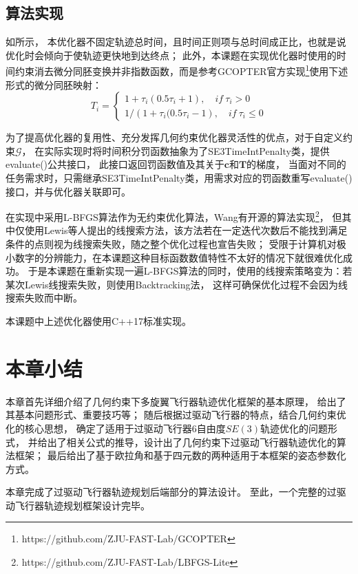 \subsection{算法实现}\label{subsec:impl_of_traj_opt_algo}
如所示， 
本优化器不固定轨迹总时间，且时间正则项与总时间成正比，也就是说优化时会倾向于使轨迹更快地到达终点；
此外，本课题在实现优化器时使用的时间约束消去微分同胚变换并非指数函数，而是参考GCOPTER官方实现\footnote{https://github.com/ZJU-FAST-Lab/GCOPTER}使用下述形式的微分同胚映射：
\begin{equation}
  T_i = 
  \begin{cases}
    1 + \tau_i(0.5\tau_i + 1), \quad if \ \tau_i > 0 \\
    {1}/({1 + \tau_i(0.5\tau_i - 1}), \quad if \ \tau_i \leq 0
  \end{cases}
  \label{equ:the_actual_diffeomorphism_used}
\end{equation}


为了提高优化器的复用性、充分发挥几何约束优化器灵活性的优点，对于自定义约束$\mathcal{G}$，
在实际实现时将时间积分罚函数抽象为了SE3TimeIntPenalty类，提供evaluate()公共接口，
此接口返回罚函数值及其关于$\bm{c}$和$\bm{T}$的梯度，
当面对不同的任务需求时，只需继承SE3TimeIntPenalty类，用需求对应的罚函数重写evaluate()接口，并与优化器关联即可。

在实现中采用L-BFGS算法\cite{liu1989limited}作为无约束优化算法，Wang有开源的算法实现\footnote{https://github.com/ZJU-FAST-Lab/LBFGS-Lite}，
但其中仅使用Lewis等人提出的线搜索方法\cite{lewis2013nonsmooth}，该方法若在一定迭代次数后不能找到满足条件的点则视为线搜索失败，随之整个优化过程也宣告失败；
受限于计算机对极小数字的分辨能力，在本课题这种目标函数数值特性不太好的情况下就很难优化成功。
于是本课题在重新实现一遍L-BFGS算法的同时，使用的线搜索策略变为：若某次Lewis线搜索失败，则使用Backtracking法，
这样可确保优化过程不会因为线搜索失败而中断。

本课题中上述优化器使用C++17标准实现。

\section{本章小结}\label{sec:summary_4}
本章首先详细介绍了几何约束下多旋翼飞行器轨迹优化框架的基本原理，
给出了其基本问题形式、重要技巧等；
随后根据过驱动飞行器的特点，结合几何约束优化的核心思想，
确定了适用于过驱动飞行器6自由度$SE(3)$轨迹优化的问题形式，
并给出了相关公式的推导，设计出了几何约束下过驱动飞行器轨迹优化的算法框架；
最后给出了基于欧拉角和基于四元数的两种适用于本框架的姿态参数化方式。

本章完成了过驱动飞行器轨迹规划后端部分的算法设计。
至此，一个完整的过驱动飞行器轨迹规划框架设计完毕。

